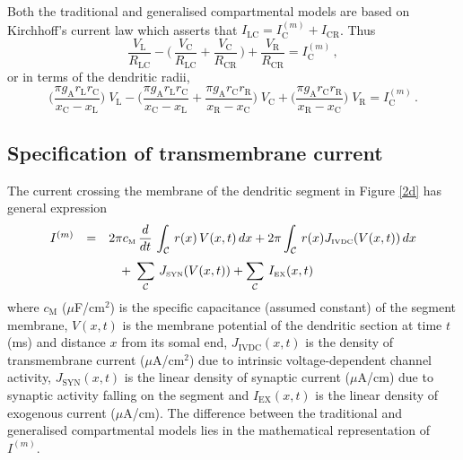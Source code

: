 Both the traditional and generalised compartmental models are
based on Kirchhoff's current law which asserts that $I_\mathrm{LC}
= I^{(m)}_\mathrm{C}+I_\mathrm{CR}$. Thus
\begin{equation}\label{car5}
\frac{V_\mathrm{L}}{R_\mathrm{LC}}
-\Big(\,\frac{V_\mathrm{C}}{R_\mathrm{LC}}
+\frac{V_\mathrm{C}}{R_\mathrm{CR}}\,\Big)
+\frac{V_\mathrm{R}}{R_\mathrm{CR}}
=I^{(m)}_\mathrm{C}\,,
\end{equation}
or in terms of the dendritic radii,
\begin{equation}\label{car6}
\Big(\frac{\pi g_\mathrm{A}r_\mathrm{L}r_\mathrm{C}}
{x_\mathrm{C}-x_\mathrm{L}}\Big)\;V_\mathrm{L}
-\Big(\frac{\pi g_\mathrm{A}r_\mathrm{L}r_\mathrm{C}}
{x_\mathrm{C}-x_\mathrm{L}}
+\frac{\pi g_\mathrm{A}r_\mathrm{C}r_\mathrm{R}}
{x_\mathrm{R}-x_\mathrm{C}}\Big)\;V_\mathrm{C}
+\Big(\frac{\pi g_\mathrm{A}r_\mathrm{C}r_\mathrm{R}}
{x_\mathrm{R}-x_\mathrm{C}}\Big)\;V_\mathrm{R}=I^{(m)}_\mathrm{C}\,.
\end{equation}

\subsection{Specification of transmembrane current}
The current crossing the membrane of the dendritic segment in
Figure \ref{2d} has general expression
\begin{equation}\label{tc0}
\begin{array}{rcl}
I^{(m)} & = & \displaystyle2\pi c_{\mbox{\tiny M}}\,\frac{d}{dt}\,
\int_\mathcal{C}\, r(x)\,V(x,t)\,dx
+2\pi\int_\mathcal{C}\, r(x)J_{\mbox{\tiny IVDC}}(V(x,t))\,dx\\[12pt]
&&\quad\displaystyle+\;\sum_\mathcal{C}\,J_{\mbox{\tiny SYN}}(V(x,t))
+\sum_\mathcal{C}\,I_{\mbox{\tiny EX}}(x,t)
\end{array}
\end{equation}
where $c_\mathrm{M}$ ($\mu$F/cm$^2$) is the specific capacitance
(assumed constant) of the segment membrane, $V(x,t)$ is the
membrane potential of the dendritic section at time $t$ (ms) and
distance $x$ from its somal end, $J_\mathrm{IVDC}(x,t)$ is the
density of transmembrane current ($\mu$A/cm$^2$) due to intrinsic
voltage-dependent channel activity, $J_\mathrm{SYN}(x,t)$ is the
linear density of synaptic current ($\mu$A/cm) due to synaptic
activity falling on the segment and $I_\mathrm{EX}(x,t)$ is the
linear density of exogenous current ($\mu$A/cm). The difference
between the traditional and generalised compartmental models lies
in the mathematical representation of $I^{(m)}$.

